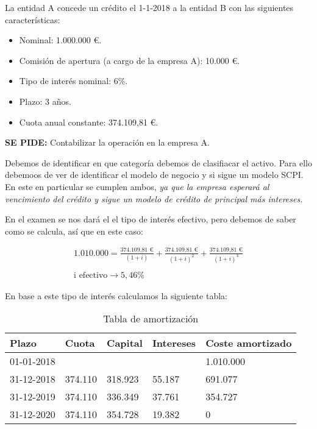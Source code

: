La entidad A concede un crédito el 1-1-2018 a la entidad B con las siguientes características:

\begin{itemize}
    \item Nominal: 1.000.000 €.
    \item Comisión de apertura (a cargo de la empresa A): 10.000 €.
    \item Tipo de interés nominal: 6\%.
    \item Plazo: 3 años.
    \item Cuota anual constante: 374.109,81 €.
\end{itemize}

\textbf{SE PIDE:} Contabilizar la operación en la empresa A.

Debemos de identificar en  que categoría debemos de clasifiacar el activo. Para ello debemoos de ver de identificar el modelo de negocio y si sigue un modelo SCPI. En este en particular se cumplen ambos, \textit{ya que la empresa esperará al vencimiento del crédito y sigue un modelo de crédito de principal más intereses.}

En el examen se nos dará el el tipo de interés efectivo, pero debemos de saber como se calcula, así que en este caso:

\begin{align*}
    \text{1.010.000} = \frac{\text{374.109,81 €}}{(1+i)} + \frac{\text{374.109,81 €}}{(1+i)^2} + \frac{\text{374.109,81 €}}{(1+i)^3} \\\\ 
    \text{i efectivo} \rightarrow 5,46\%
\end{align*}

En base a este tipo de interés calculamos la siguiente tabla:

\begin{table}[h]
    \centering
    \caption{Tabla de amortización}
    \begin{tabularx}{\textwidth}{|X|X|X|X|X|}
    \hline
    \textbf{Plazo} & \textbf{Cuota} & \textbf{Capital} & \textbf{Intereses} & \textbf{Coste amortizado} \\
    \hline
    01-01-2018 & & & & 1.010.000 \\
    \hline
    31-12-2018 & 374.110 & 318.923 & 55.187 & 691.077 \\
    \hline
    31-12-2019 & 374.110 & 336.349 & 37.761 & 354.727 \\
    \hline
    31-12-2020 & 374.110 & 354.728 & 19.382 & 0 \\
    \hline
    \end{tabularx}
    \label{tabla:amortizacion1}
\end{table}

